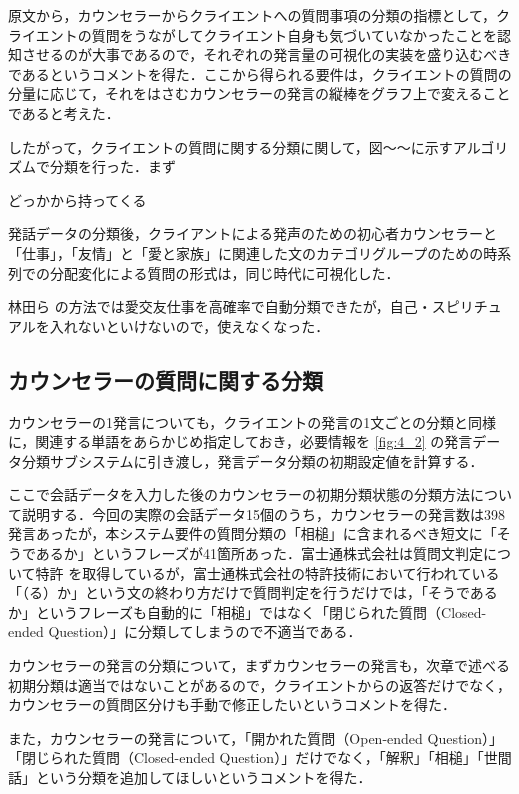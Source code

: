 \documentclass[shuuron]{kuee}
\begin{document}
原文から，カウンセラーからクライエントへの質問事項の分類の指標として，クライエントの質問をうながしてクライエント自身も気づいていなかったことを認知させるのが大事であるので，それぞれの発言量の可視化の実装を盛り込むべきであるというコメントを得た．ここから得られる要件は，クライエントの質問の分量に応じて，それをはさむカウンセラーの発言の縦棒をグラフ上で変えることであると考えた．

したがって，クライエントの質問に関する分類に関して，図〜〜に示すアルゴリズムで分類を行った．まず

どっかから持ってくる

発話データの分類後，クライアントによる発声のための初心者カウンセラーと「仕事」，「友情」と「愛と家族」に関連した文のカテゴリグループのための時系列での分配変化による質問の形式は，同じ時代に可視化した．

林田ら\cite{hayashidaJp} \cite{hayashidaEn}の方法では愛交友仕事を高確率で自動分類できたが，自己・スピリチュアルを入れないといけないので，使えなくなった．

\subsection{カウンセラーの質問に関する分類} %

カウンセラーの1発言についても，クライエントの発言の1文ごとの分類と同様に，関連する単語をあらかじめ指定しておき，必要情報を
\ref{fig:4_2}
の発言データ分類サブシステムに引き渡し，発言データ分類の初期設定値を計算する．

ここで会話データを入力した後のカウンセラーの初期分類状態の分類方法について説明する．今回の実際の会話データ15個のうち，カウンセラーの発言数は398発言あったが，本システム要件の質問分類の「相槌」に含まれるべき短文に「そうであるか」というフレーズが41箇所あった．富士通株式会社は質問文判定について特許
\cite{tokkyo}
を取得しているが，富士通株式会社の特許技術において行われている「（る）か」という文の終わり方だけで質問判定を行うだけでは，「そうであるか」というフレーズも自動的に「相槌」ではなく「閉じられた質問（Closed-ended Question）」に分類してしまうので不適当である．

カウンセラーの発言の分類について，まずカウンセラーの発言も，次章で述べる初期分類は適当ではないことがあるので，クライエントからの返答だけでなく，カウンセラーの質問区分けも手動で修正したいというコメントを得た．

また，カウンセラーの発言について，「開かれた質問（Open-ended Question）」「閉じられた質問（Closed-ended Question）」だけでなく，「解釈」「相槌」「世間話」という分類を追加してほしいというコメントを得た．
\end{document}
